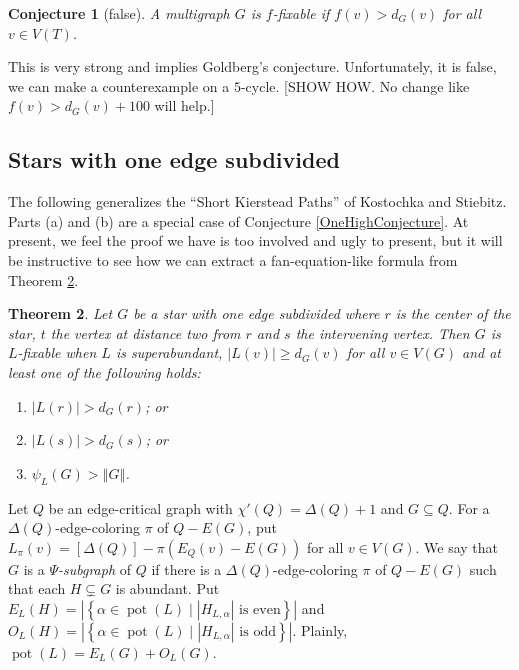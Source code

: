\documentclass[12pt]{article}
\theoremstyle{plain}
\newtheorem{thm}{Theorem}[section]
\newtheorem{conjecture}[thm]{Conjecture}
\theoremstyle{definition}
\theoremstyle{remark}
\newcommand{\setb}[3]{\left\{ #1 \in #2 \mid #3 \right\}}
\newcommand{\card}[1]{\left|#1\right|}
\newcommand{\size}[1]{\left\Vert#1\right\Vert}
\newcommand{\irange}[1]{\left[#1\right]}
\newcommand{\parens}[1]{\left( #1 \right)}
\newcommand{\pot}{\operatorname{pot}}
\begin{document}
\begin{conjecture}[false]\label{MoonshineConjecture}
	A multigraph $G$ is $f$-fixable if $f(v) > d_G(v)$ for all $v \in V(T)$.
\end{conjecture}

This is very strong and implies Goldberg's conjecture.  Unfortunately, it is false, we can make a counterexample on a $5$-cycle. [SHOW HOW.  No change like $f(v) > d_G(v) + 100$ will help.] 
	
\subsection{Stars with one edge subdivided}
The following generalizes the ``Short Kierstead Paths'' of Kostochka and Stiebitz.  Parts (a) and (b) are a special case of Conjecture \ref{OneHighConjecture}. At present, we feel the proof we have is too involved and ugly to present, but it will be instructive to see how we can extract a fan-equation-like formula from Theorem \ref{StarWithOneEdgeSubdivided}. 

\begin{thm}\label{StarWithOneEdgeSubdivided}
	Let $G$ be a star with one edge subdivided where $r$ is the center of the star, $t$ the vertex at distance two from $r$ and $s$ the intervening vertex.  
	Then $G$ is $L$-fixable when $L$ is superabundant, $|L(v)| \ge d_G(v)$ for all $v \in V(G)$ and at least one of the following holds:
	\begin{enumerate}
		\item[(a)] $|L(r)| > d_G(r)$; or
		\item[(b)] $|L(s)| > d_G(s)$; or
		\item[(c)] $\psi_L(G) > \size{G}$.
	\end{enumerate}
\end{thm}

Let $Q$ be an edge-critical graph with $\chi'(Q) = \Delta(Q) + 1$ and $G \subseteq Q$.  For a $\Delta(Q)$-edge-coloring $\pi$ of $Q - E(G)$, put $L_\pi(v) = \irange{\Delta(Q)} - \pi\parens{E_Q(v) - E(G)}$ for all $v \in V(G)$.  We say that $G$ is a \emph{$\Psi$-subgraph} of $Q$ if there is a $\Delta(Q)$-edge-coloring $\pi$ of $Q - E(G)$ such that each $H \subsetneq G$ is abundant. Put $E_{L}(H) = \card{\setb{\alpha}{\pot(L)}{\card{H_{L, \alpha}} \text{ is even}}}$ and $O_{L}(H) = \card{\setb{\alpha}{\pot(L)}{\card{H_{L, \alpha}} \text{ is odd}}}$.  Plainly, $\pot(L) = E_{L}(G) + O_{L}(G)$.
\end{document}

